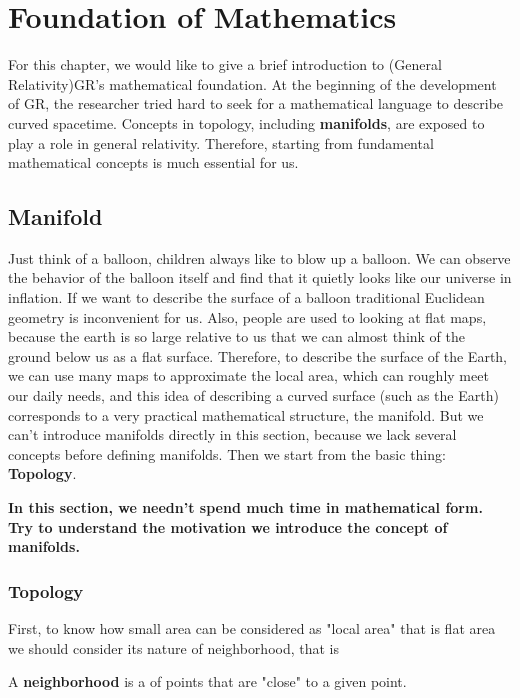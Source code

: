 \newpage

\mainmatter
{}
\chapter{Foundation of Mathematics}

For this chapter, we would like to give a brief introduction to (General Relativity)GR's mathematical foundation. At the beginning of the development of GR, the researcher tried hard to seek for a mathematical language to describe curved spacetime. Concepts in topology, including \textbf{manifolds}, are exposed to play a role in general relativity. Therefore, starting from fundamental mathematical concepts is much essential for us.

\newpage

\section{Manifold}
Just think of a balloon, children always like to blow up a balloon. We can observe the behavior of the balloon itself and find that it quietly looks like our universe in inflation. If we want to describe the surface of a balloon traditional Euclidean geometry is inconvenient for us. Also, people are used to looking at flat maps, because the earth is so large relative to us that we can almost think of the ground below us as a flat surface. Therefore, to describe the surface of the Earth, we can use many maps to approximate the local area, which can roughly meet our daily needs, and this idea of describing a curved surface (such as the Earth) corresponds to a very practical mathematical structure, the manifold. But we can't introduce manifolds directly in this section, because we lack several concepts before defining manifolds. Then we start from the basic thing: \textbf{Topology}. 

\textbf{In this section, we needn't spend much time in mathematical form. Try to understand the motivation we introduce the concept of manifolds.}

\subsection{Topology}

First, to know how small area can be considered as "local area" that is flat area we should consider its nature of neighborhood, that is 

\begin{tcolorbox}[title=\textbf{Neighborbood},colback=SeaGreen!10!CornflowerBlue!10,colframe=RoyalPurple!55!Aquamarine!100!]
    A \textbf{neighborhood} is a of points that are "close" to a given point. 
\end{tcolorbox}

